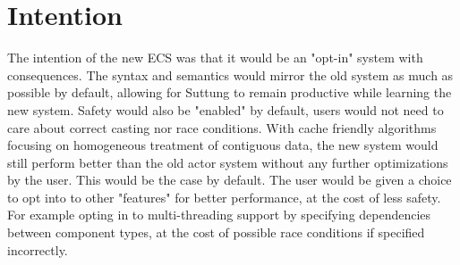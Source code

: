 \section{Intention}
\label{subsec:high_level_intention}
The intention of the new ECS was that it would be an "opt-in" system with consequences.
The syntax and semantics would mirror the old system as much as possible by default, allowing for Suttung to remain productive while learning the new system.
Safety would also be "enabled" by default, users would not need to care about correct casting nor race conditions.
With cache friendly algorithms focusing on homogeneous treatment of contiguous data,
the new system would still perform better than the old actor system without any further optimizations by the user.
This would be the case by default.
The user would be given a choice to opt into to other "features" for better performance, at the cost of less safety.
For example opting in to multi-threading support by specifying dependencies between component types, at the cost of possible
race conditions if specified incorrectly.
